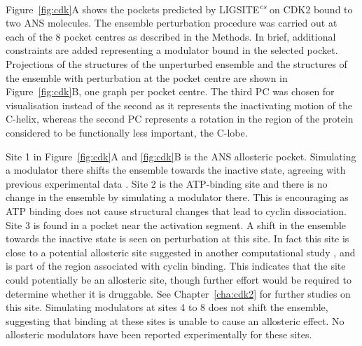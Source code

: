 Figure~\ref{fig:cdk}A shows the pockets predicted by LIGSITE\textsuperscript{\it cs} \cite{Huang2006} on CDK2 bound to two ANS molecules.
The ensemble perturbation procedure was carried out at each of the 8 pocket centres as described in the Methods.
In brief, additional constraints are added representing a modulator bound in the selected pocket.
Projections of the structures of the unperturbed ensemble and the structures of the ensemble with perturbation at the pocket centre are shown in Figure~\ref{fig:cdk}B, one graph per pocket centre.
The third PC was chosen for visualisation instead of the second as it represents the inactivating motion of the \textalpha C-helix, whereas the second PC represents a rotation in the region of the protein considered to be functionally less important, the C-lobe.

Site 1 in Figure~\ref{fig:cdk}A and \ref{fig:cdk}B is the ANS allosteric pocket.
Simulating a modulator there shifts the ensemble towards the inactive state, agreeing with previous experimental data \cite{Betzi2011}.
Site 2 is the ATP-binding site and there is no change in the ensemble by simulating a modulator there.
This is encouraging as ATP binding does not cause structural changes that lead to cyclin dissociation.
Site 3 is found in a pocket near the activation segment.
A shift in the ensemble towards the inactive state is seen on perturbation at this site.
In fact this site is close to a potential allosteric site suggested in another computational study \cite{Pitt2014}, and is part of the region associated with cyclin binding.
This indicates that the site could potentially be an allosteric site, though further effort would be required to determine whether it is druggable.
See Chapter~\ref{cha:cdk2} for further studies on this site.
Simulating modulators at sites 4 to 8 does not shift the ensemble, suggesting that binding at these sites is unable to cause an allosteric effect.
No allosteric modulators have been reported experimentally for these sites.


